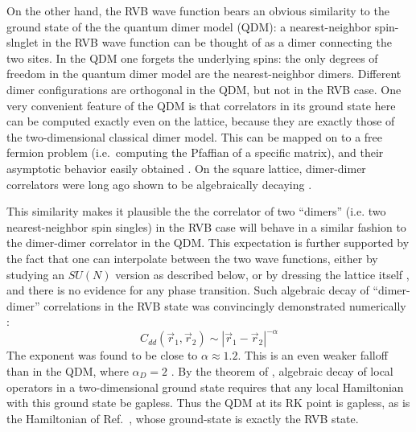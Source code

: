 \documentclass[11pt]{iopart}
\begin{document}
On the other hand, the RVB wave function bears an obvious similarity to the ground state of the
 the quantum dimer model (QDM)\cite{RokhsarKivelson}: a nearest-neighbor spin-slnglet in the RVB wave function can be thought of as a dimer connecting the two sites. In the QDM one forgets the underlying spins: the only degrees of freedom in the quantum dimer model are the nearest-neighbor dimers. Different dimer configurations are orthogonal in the QDM, but  not in the RVB case. One very convenient feature of the QDM is that  correlators in its ground state here can be computed exactly even on the lattice, because they are exactly those of the two-dimensional classical dimer model. This can be mapped on to a free fermion problem (i.e.\ computing the Pfaffian of a specific matrix), and their asymptotic behavior easily obtained \cite{Kasteleyn, Fisher}. On the square lattice, dimer-dimer correlators were long ago shown to be algebraically decaying \cite{FisherStephenson}.

This similarity makes it plausible the the correlator of two ``dimers'' (i.e. two nearest-neighbor spin singles) in the RVB case will behave in a similar fashion to the dimer-dimer correlator in the QDM. This expectation is further supported by the fact that one can interpolate between the two wave functions, either by studying an $SU(N)$ version as described below, or by dressing the lattice itself \cite{RMS}, and there is no evidence for any phase transition. Such algebraic decay of   ``dimer-dimer'' correlations  in the RVB state was convincingly demonstrated numerically
\cite{RVB1,RVB2}:
 \begin{equation}
  C_{dd}(\vec{r}_1,\vec{r}_2) \sim \left|\vec{r}_1-\vec{r}_2\right|^{-\alpha}
 \end{equation}
The exponent was found to be close to $\alpha \approx 1.2$. This is an even weaker falloff than in the QDM, where $\alpha_D=2$ \cite{FisherStephenson}. By the theorem of \cite{Hastings_thm}, algebraic decay of local operators in a two-dimensional ground state requires that any local Hamiltonian with this ground state be gapless. Thus the QDM at its RK point is gapless, as is the Hamiltonian of Ref.~\cite{Cano}, whose ground-state is exactly the RVB state. 

\end{document}
